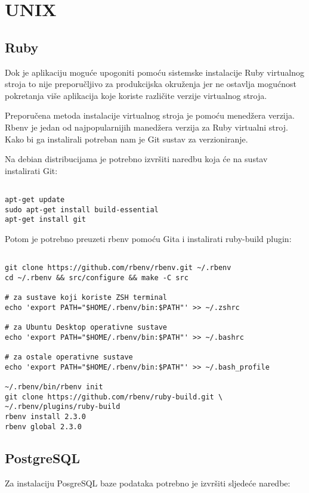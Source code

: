 \documentclass[times, utf8, zavrsni]{fer}
\begin{document}
\section{UNIX}
\subsection{Ruby}
Dok je aplikaciju moguće upogoniti pomoću sistemske instalacije Ruby virtualnog
stroja to nije preporučljivo za produkcijska okruženja jer ne ostavlja mogućnost
pokretanja više aplikacija koje koriste različite verzije virtualnog stroja.

Preporučena metoda instalacije virtualnog stroja je pomoću menedžera verzija.
Rbenv je jedan od najpopularnijih manedžera verzija za Ruby virtualni stroj.
Kako bi ga instalirali potreban nam je Git sustav za verzioniranje.

Na debian distribucijama je potrebno izvršiti naredbu koja će na sustav
instalirati Git:

\begin{lstlisting}

apt-get update
sudo apt-get install build-essential
apt-get install git

\end{lstlisting}

Potom je potrebno preuzeti rbenv pomoću Gita i instalirati ruby-build plugin:

\begin{lstlisting}

git clone https://github.com/rbenv/rbenv.git ~/.rbenv
cd ~/.rbenv && src/configure && make -C src

# za sustave koji koriste ZSH terminal
echo 'export PATH="$HOME/.rbenv/bin:$PATH"' >> ~/.zshrc

# za Ubuntu Desktop operativne sustave
echo 'export PATH="$HOME/.rbenv/bin:$PATH"' >> ~/.bashrc

# za ostale operativne sustave
echo 'export PATH="$HOME/.rbenv/bin:$PATH"' >> ~/.bash_profile

~/.rbenv/bin/rbenv init
git clone https://github.com/rbenv/ruby-build.git \
~/.rbenv/plugins/ruby-build
rbenv install 2.3.0
rbenv global 2.3.0

\end{lstlisting}

\subsection{PostgreSQL}
Za instalaciju PosgreSQL baze podataka potrebno je izvršiti sljedeće naredbe:
\end{document}
